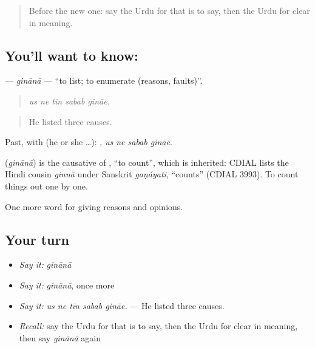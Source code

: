 \begin{quote}
Before the new one: say the Urdu for that is to say, then the Urdu for clear in meaning.
\end{quote}

\subsection*{You'll want to know: }
\textbf{} — \emph{ginānā} — \textquotedblleft{}to list; to enumerate (reasons, faults)\textquotedblright{}.

\begin{quote}
    
\end{quote}

\begin{quote}
\emph{us ne tīn sabab gināe.}
\end{quote}

\begin{quote}
He listed three causes.
\end{quote}

Past, with  (he or she …):    , \emph{us ne sabab gināe}.

\begin{cousinweb}
\textbf{} (\emph{ginānā}) is the causative of \textbf{}, \textquotedblleft{}to count\textquotedblright{}, which is inherited: CDIAL lists the Hindi cousin \emph{ginnā} under Sanskrit \emph{gaṇáyati}, \textquotedblleft{}counts\textquotedblright{} (CDIAL 3993). To count things out one by one.
\end{cousinweb}

\begin{grammarlens}[title={What you've built}]
One more word for giving reasons and opinions.
\end{grammarlens}

\subsection*{Your turn}
\begin{itemize}
\raggedright
  \item \emph{Say it:} \emph{ginānā}
  \item \emph{Say it:} \emph{ginānā}, once more
  \item \emph{Say it:} \emph{us ne tīn sabab gināe.} — He listed three causes.
  \item \emph{Recall:} say the Urdu for that is to say, then the Urdu for clear in meaning, then say \emph{ginānā} again
\end{itemize}

